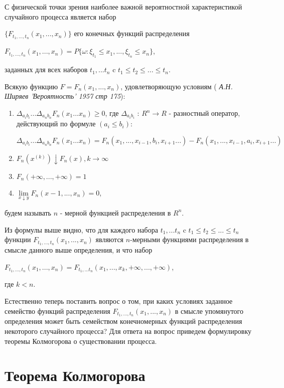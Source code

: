 \documentclass[12pt]{article}
\begin{document}
С физической точки зрения наиболее важной вероятностной характеристикой случайного процесса является набор 

$\lbrace F_{t_{1}, ..., t_{n}}(x_1, ..., x_n) \rbrace$ его конечных функций распределения
\begin{center}
 $ F_{t_{1}, ..., t_{n}}(x_1, ..., x_n) = P \lbrace \omega : \xi_{t_1} \leq x_1, ..., \xi_{t_n} \leq x_n \rbrace$,
\end{center}
заданных для всех наборов $t_1, ... t_n$ c $t_1 \le t_2 \le ... \le t_n$.

Всякую функцию $F = F_n (x_1, ..., x_n)$, удовлетворяющую условиям ( \textit{А.Н. Ширяев 'Вероятность' 1957 стр 175}):
\begin{enumerate}
\item $	\Delta_{a_i b_i}...\Delta_{a_n b_n} F_n (x_1... x_n) \geq 0$, где $	\Delta_{a_i b_i}$ : $R^n \rightarrow R$ - разностный оператор, действующий по формуле $(a_i \leq b_i)$:
\begin{center}
$\Delta_{a_i b_i}...\Delta_{a_n b_n} F_n (x_1... x_n) = F_n(x_1, ..., x_{i-1}, b_i, x_{i+1} ...) - F_n(x_1, ..., x_{i-1}, a_i, x_{i+1} ...) $
\end{center}
\item $F_n(x^{(k)}) \downarrow F_n(x), k  \rightarrow \infty$
\item $F_n(+\infty , ..., +\infty) = 1$
\item $\lim\limits_{x \downarrow y} F_n(x-1, ..., x_n) = 0$,
\end{enumerate}
будем называть $n$ - мерной функцией распределения в $R^n$.

Из формулы выше видно, что для каждого набора $t_1, ... t_n$ c $t_1 \le t_2 \le ... \le t_n$ функции $F_{t_{1}, ..., t_{n}}(x_1, ..., x_n)$ являются $n$-мерными функциями распределения в смысле данного выше определения, и что набор 
\begin{center}
 $ F_{t_{1}, ..., t_{n}}(x_1, ..., x_n) = F_{{t_1}, ... {t_n}} (x_1 , ..., x_k, +\infty , ..., +\infty)$, 
\end{center}
где $k < n$.

Естественно теперь поставить вопрос о том, при каких условиях заданное семейство функций распределения $F_{t_{1}, ..., t_{n}}(x_1, ..., x_n)$ в смысле упомянутого определения может быть семейством конечномерных функций распределения некоторого случайного процесса? Для ответа на вопрос приведем формулировку теоремы Колмогорова о существовании процесса. 

\section{Теорема Колмогорова}
\end{document}
